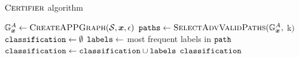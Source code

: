 \begin{algorithm}[H]
	\caption[$\algtitle{Certifier}$ algorithm]{$\algtitle{Certifier}$ algorithm}
	\label{alg:certifier-full}
	\begin{algorithmic}[1]
    \State $\mathbb{G}^A_{\bm{x}} \gets \textsc{CreateAPPGraph}(\mathcal{S}, \bm{x}, \epsilon)$
    \State $\var{paths} \gets \algtitle{SelectAdvValidPaths}(\APPG,\ $k$)$
    \State $\mathtt{classification} \gets \emptyset$
      \State $\mathtt{labels} \gets $ most frequent labels in $\mathtt{path}$
      \State $\mathtt{classification} \gets \mathtt{classification} \cup \mathtt{labels}$
    \EndFor
    \State \Return $\mathtt{classification}$
	\end{algorithmic}
\end{algorithm}

